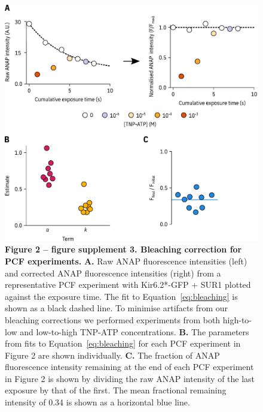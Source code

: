 \documentclass[10pt,lineno, doublespacing]{elife}
\begin{document}
\begin{figure}
\begin{fullwidth}
\centering
\includegraphics[width=\textwidth]{figure_two_s3}
\captionsetup{labelformat=empty}
\caption{
\textbf{Figure 2 -- figure supplement 3. Bleaching correction for PCF experiments.}
\textbf{A.}
Raw ANAP fluorescence intensities (left) and corrected ANAP fluorescence intensities (right) from a representative PCF experiment with Kir6.2*-GFP + SUR1 plotted against the exposure time.
The fit to Equation~\ref{eq:bleaching} is shown as a black dashed line.
To minimise artifacts from our bleaching corrections we performed experiments from both high-to-low and low-to-high TNP-ATP concentrations.
\textbf{B.}
The parameters from fits to Equation~\ref{eq:bleaching} for each PCF experiment in Figure 2 are shown individually.
\textbf{C.}
The fraction of ANAP fluorescence intensity remaining at the end of each PCF experiment in Figure 2 is shown by dividing the raw ANAP intensity of the last exposure by that of the first.
The mean fractional remaining intensity of 0.34 is shown as a horizontal blue line.
}
\label{fig:two_s3}
\end{fullwidth}
\end{figure}
\end{document}
